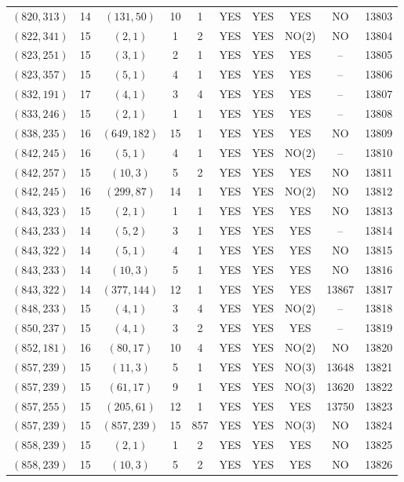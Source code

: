 \begin{longtable}{|c|c|c|c|c|c|c|c|c|c|}
$(820, 313)$ & 14 & $(131, 50)$ & 10 & 1 & YES & YES & YES & NO & 13803\\
$(822, 341)$ & 15 & $(2, 1)$ & 1 & 2 & YES & YES & NO(2) & NO & 13804\\
$(823, 251)$ & 15 & $(3, 1)$ & 2 & 1 & YES & YES & YES & -- & 13805\\
$(823, 357)$ & 15 & $(5, 1)$ & 4 & 1 & YES & YES & YES & -- & 13806\\
$(832, 191)$ & 17 & $(4, 1)$ & 3 & 4 & YES & YES & YES & -- & 13807\\
$(833, 246)$ & 15 & $(2, 1)$ & 1 & 1 & YES & YES & YES & -- & 13808\\
$(838, 235)$ & 16 & $(649, 182)$ & 15 & 1 & YES & YES & YES & NO & 13809\\
$(842, 245)$ & 16 & $(5, 1)$ & 4 & 1 & YES & YES & NO(2) & -- & 13810\\
$(842, 257)$ & 15 & $(10, 3)$ & 5 & 2 & YES & YES & YES & NO & 13811\\
$(842, 245)$ & 16 & $(299, 87)$ & 14 & 1 & YES & YES & NO(2) & NO & 13812\\
$(843, 323)$ & 15 & $(2, 1)$ & 1 & 1 & YES & YES & YES & NO & 13813\\
$(843, 233)$ & 14 & $(5, 2)$ & 3 & 1 & YES & YES & YES & -- & 13814\\
$(843, 322)$ & 14 & $(5, 1)$ & 4 & 1 & YES & YES & YES & NO & 13815\\
$(843, 233)$ & 14 & $(10, 3)$ & 5 & 1 & YES & YES & YES & NO & 13816\\
$(843, 322)$ & 14 & $(377, 144)$ & 12 & 1 & YES & YES & YES & 13867 & 13817\\
$(848, 233)$ & 15 & $(4, 1)$ & 3 & 4 & YES & YES & NO(2) & -- & 13818\\
$(850, 237)$ & 15 & $(4, 1)$ & 3 & 2 & YES & YES & YES & -- & 13819\\
$(852, 181)$ & 16 & $(80, 17)$ & 10 & 4 & YES & YES & NO(2) & NO & 13820\\
$(857, 239)$ & 15 & $(11, 3)$ & 5 & 1 & YES & YES & NO(3) & 13648 & 13821\\
$(857, 239)$ & 15 & $(61, 17)$ & 9 & 1 & YES & YES & NO(3) & 13620 & 13822\\
$(857, 255)$ & 15 & $(205, 61)$ & 12 & 1 & YES & YES & YES & 13750 & 13823\\
$(857, 239)$ & 15 & $(857, 239)$ & 15 & 857 & YES & YES & NO(3) & NO & 13824\\
$(858, 239)$ & 15 & $(2, 1)$ & 1 & 2 & YES & YES & YES & NO & 13825\\
$(858, 239)$ & 15 & $(10, 3)$ & 5 & 2 & YES & YES & YES & NO & 13826\\

\end{longtable}
